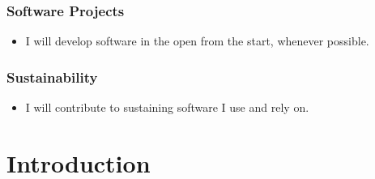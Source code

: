 \documentclass[a4paper,UKenglish]{dagman}
\renewcommand{\paragraph}[1]{\subsubsection*{#1}\xspace}
\begin{document}
\paragraph{Software Projects}
\begin{itemize}
\item I will develop software in the open from the start, whenever possible.


\end{itemize}

\paragraph{Sustainability}
\begin{itemize}
\item I will contribute to sustaining software I use and rely on. 

\end{itemize}



\tableofcontents

\section{Introduction}
\end{document}
